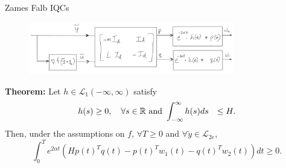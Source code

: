 \documentclass{beamer}
\begin{document}
\begin{frame}{Zames Falb IQCs}	
	\begin{figure}[t]
		\includegraphics[width=9cm]{figures/signal_definitions_p_q_w.PNG}
		\centering
	\end{figure}
\textbf{Theorem:} Let $h \in \mathcal{L}_1(-\infty,\infty)$ satisfy
		\begin{equation} \label{eq:zf_impulse_resp_cond}
			\begin{aligned}
				h(s) &\geq 0, \quad \forall s \in \mathbb{R} \textnormal{ and } \int_{-\infty}^{\infty}h(s)ds &\leq H.
			\end{aligned}
		\end{equation}	
	Then, under the assumptions on $f$, $\forall T \geq 0$ and $\forall \tilde{y} \in \mathcal{L}_{2e}$,	
		\begin{equation}
			\int_0^T e^{2\alpha t}( H p(t)^T q(t) - p(t)^T w_1(t) - q(t)^T w_2(t)) dt \geq 0.
		\end{equation}

\end{frame}
\end{document}
